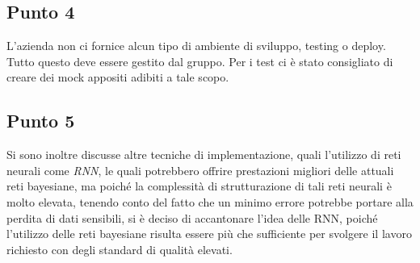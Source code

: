\subsection{Punto 4}
L'azienda non ci fornice alcun tipo di ambiente di sviluppo, testing o deploy. Tutto questo deve essere 
gestito dal gruppo. Per i test ci è stato consigliato di creare dei mock appositi adibiti a tale scopo. 

\subsection{Punto 5}
Si sono inoltre discusse altre tecniche di implementazione, quali l'utilizzo di reti neurali come \textit{RNN}, 
le quali potrebbero offrire prestazioni migliori delle attuali reti bayesiane, ma poiché la complessità di 
strutturazione di tali reti neurali è molto elevata, tenendo conto del fatto che un minimo errore potrebbe 
portare alla perdita di dati sensibili, si è deciso di accantonare l'idea delle RNN, poiché l'utilizzo delle reti 
bayesiane risulta essere più che sufficiente per svolgere il lavoro richiesto con degli standard di qualità elevati. 
